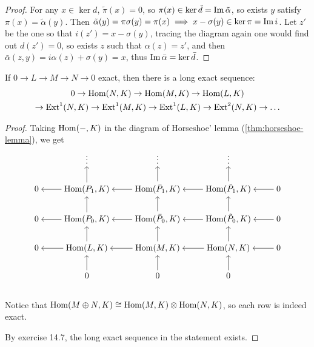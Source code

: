 \begin{theorem}
\begin{proof}
   For any $x \in \ker d$, $\tilde \pi(x) = 0$, so $\pi(x) \in \ker \tilde d
   = \operatorname{Im} \tilde \alpha$, so exists $y$ satisfy $\pi(x) = \tilde \alpha (y)$.
   Then $\tilde \alpha(y) = \pi \sigma (y) = \pi (x) \implies x - \sigma(y) \in
   \ker \pi = \operatorname{Im} i$. Let $z'$ be the one so that $i(z') = x - \sigma(y)$,
   tracing the diagram again one would find out $d(z') = 0$, so exists $z$
   such that $\alpha(z) = z'$, and then $\bar \alpha(z, y) = i \alpha(z) + \sigma(y) = x$,
   thus $\operatorname{Im} \bar \alpha = \ker \bar d$.
   \end{proof}
\end{theorem}

\begin{theorem}
  If $0 \to L \to M \to N \to 0$ exact, then there is a long exact sequence:
  \begin{multline*} 0 \to \operatorname{Hom}(N, K) \to \operatorname{Hom}(M, K) \to \operatorname{Hom}(L, K) \\
    \to \operatorname{Ext}^1(N, K) \to \operatorname{Ext}^1(M, K) \to \operatorname{Ext}^1(L, K) \to \operatorname{Ext}^2(N, K) \to \dots
  \end{multline*}

  \begin{proof}
    Taking $\operatorname{Hom}({-}, K)$ in the diagram of Horseshoe' lemma (\ref{thm:horseshoe-lemma}),
    we get
  \[ \begin{tikzcd}[cramped]
      & \vdots \ar[leftarrow, d] & \vdots \ar[leftarrow, d] & \vdots \ar[leftarrow, d] & \\
      0 \ar[leftarrow, r] & \Hom(P_1, K) \ar[leftarrow, r] \ar[leftarrow, d] & \Hom(\bar P_1, K) \ar[leftarrow, r] \ar[leftarrow, d] & \Hom(\tilde P_1, K) \ar[leftarrow, r] \ar[leftarrow, d] & 0 \\
      0 \ar[leftarrow, r] & \Hom(P_0, K) \ar[leftarrow, r] \ar[leftarrow, d] & \Hom(\bar P_0, K) \ar[leftarrow, r] \ar[leftarrow, d] & \Hom(\tilde P_0, K) \ar[leftarrow, r] \ar[leftarrow, d] & 0 \\
      0 \ar[leftarrow, r] & \Hom(L  , K) \ar[leftarrow, r] \ar[leftarrow, d] & \Hom(M       , K) \ar[leftarrow, r] \ar[leftarrow, d] & \Hom(N         , K) \ar[leftarrow, r] \ar[leftarrow, d] & 0 \\
      & 0 & 0 & 0 & \\
     \end{tikzcd} \]
   Notice that $\operatorname{Hom}(M \oplus N, K) \cong \operatorname{Hom}(M, K) \otimes \operatorname{Hom}(N, K)$, so
   each row is indeed exact.

   By exercise 14.7, the long exact sequence in the statement exists.
  \end{proof}
\end{theorem}

